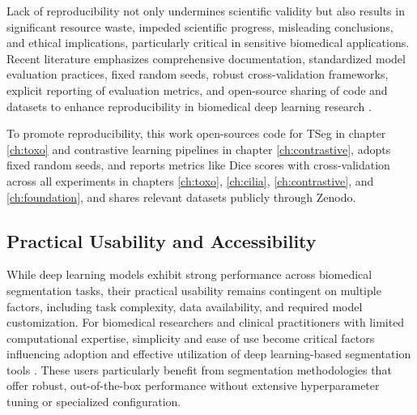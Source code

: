 \documentclass[./dissertation.tex]{subfiles}
\begin{document}
Lack of reproducibility not only undermines scientific validity but also results in significant resource waste, impeded scientific progress, misleading conclusions, and ethical implications, particularly critical in sensitive biomedical applications. Recent literature emphasizes comprehensive documentation, standardized model evaluation practices, fixed random seeds, robust cross-validation frameworks, explicit reporting of evaluation metrics, and open-source sharing of code and datasets to enhance reproducibility in biomedical deep learning research \cite{renard2020variability}.

To promote reproducibility, this work open-sources code for TSeg in chapter \ref{ch:toxo} and contrastive learning pipelines in chapter \ref{ch:contrastive}, adopts fixed random seeds, and reports metrics like Dice scores with cross-validation across all experiments in chapters \ref{ch:toxo}, \ref{ch:cilia}, \ref{ch:contrastive}, and \ref{ch:foundation}, and shares relevant datasets publicly through Zenodo.



\subsection{Practical Usability and Accessibility}
While deep learning models exhibit strong performance across biomedical segmentation tasks, their practical usability remains contingent on multiple factors, including task complexity, data availability, and required model customization. For biomedical researchers and clinical practitioners with limited computational expertise, simplicity and ease of use become critical factors influencing adoption and effective utilization of deep learning-based segmentation tools \cite{wang2021annotation}. These users particularly benefit from segmentation methodologies that offer robust, out-of-the-box performance without extensive hyperparameter tuning or specialized configuration.
\end{document}
